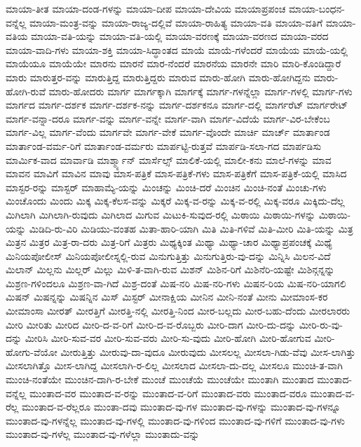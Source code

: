 {ಮಾಯಾ-ತೀತ
ಮಾಯಾ-ದಂಡ-ಗಳನ್ನು
ಮಾಯಾ-ದೀಪ
ಮಾಯಾ-ದೇವಿಯ
ಮಾಯಾಪ್ರಪಂಚ
ಮಾಯಾ-ಬಂಧನ-ವನ್ನೆಲ್ಲ
ಮಾಯಾ-ಮಂತ್ರ-ವನ್ನು
ಮಾಯಾ-ರಾಜ್ಯ-ದಲ್ಲಿವೆ
ಮಾಯಾ-ರಾಹಿತ್ಯ
ಮಾಯಾ-ವತಿ
ಮಾಯಾ-ವತಿಗೆ
ಮಾಯಾ-ವತಿಯ
ಮಾಯಾ-ವತಿ-ಯನ್ನು
ಮಾಯಾ-ವತಿ-ಯಲ್ಲಿ
ಮಾಯಾ-ವರಣಕ್ಕೆ
ಮಾಯಾ-ವರಣದ
ಮಾಯಾ-ವರದ
ಮಾಯಾ-ವಾದಿ-ಗಳು
ಮಾಯಾ-ಶಕ್ತಿ
ಮಾಯಾ-ಸಿದ್ಧಾಂತದ
ಮಾಯೆ
ಮಾಯೆ-ಗಳೆಂದರೆ
ಮಾಯೆಯ
ಮಾಯೆ-ಯಲ್ಲಿ
ಮಾಯೆಯೂ
ಮಾಯೆಯೇ
ಮಾರನು
ಮಾರನೆ
ಮಾರ-ನೆಂದರೆ
ಮಾರನೆಯ
ಮಾರನೇ
ಮಾರಿ
ಮಾರಿ-ಕೊಂಡಿದ್ದಾರೆ
ಮಾರು
ಮಾರುತ್ತರ-ವನ್ನು
ಮಾರುತ್ತಿದ್ದ
ಮಾರುತ್ತಿದ್ದರು
ಮಾರುವ
ಮಾರು-ಹೋಗಿ
ಮಾರು-ಹೋಗಿದ್ದನು
ಮಾರು-ಹೋಗಿ-ರುವೆ
ಮಾರು-ಹೋದರು
ಮಾರ್ಗ
ಮಾರ್ಗಕ್ಕಾಗಿ
ಮಾರ್ಗಕ್ಕೆ
ಮಾರ್ಗ-ಗಳನ್ನೆಲ್ಲಾ
ಮಾರ್ಗ-ಗಳಲ್ಲಿ
ಮಾರ್ಗ-ಗಳು
ಮಾರ್ಗದ
ಮಾರ್ಗ-ದರ್ಶಕ
ಮಾರ್ಗ-ದರ್ಶಕ-ನನ್ನು
ಮಾರ್ಗ-ದರ್ಶಕನೂ
ಮಾರ್ಗ-ದಲ್ಲಿ
ಮಾರ್ಗರೆಟ್
ಮಾರ್ಗರೇಟ್
ಮಾರ್ಗ-ವನ್ನಾ-ದರೂ
ಮಾರ್ಗ-ವನ್ನು
ಮಾರ್ಗ-ವನ್ನೇ
ಮಾರ್ಗ-ವಾಗಿ
ಮಾರ್ಗ-ವಿದೆಯೆ
ಮಾರ್ಗ-ವಿರ-ಬೇಕೆಂಬ
ಮಾರ್ಗ-ವಿಲ್ಲ
ಮಾರ್ಗ-ವೆಂದು
ಮಾರ್ಗವೇ
ಮಾರ್ಗ-ವೇಕೆ
ಮಾರ್ಗ-ವೊಂದೇ
ಮಾರ್ಚಿ
ಮಾರ್ಚ್
ಮಾರ್ತಾಂಡ
ಮಾರ್ತಾಂಡ-ವರ್ಮ-ರಿಗೆ
ಮಾರ್ತಾಂಡ-ವರ್ಮರು
ಮಾರ್ಪಟ್ಟಿ-ರುತ್ತವೆ
ಮಾರ್ಪಡಿ-ಸಲಾ-ಗದ
ಮಾರ್ಪಡಿಸು
ಮಾರ್ಮಿಕ-ವಾದ
ಮಾರ್ವಾಡಿ
ಮಾರ್ಶ್ಮ್ಯಾನ್
ಮಾರ್ಸೆಲ್ಸ್
ಮಾಲಿಕೆ-ಯಲ್ಲಿ
ಮಾಲೀ-ಕನು
ಮಾಲೆ-ಗಳನ್ನು
ಮಾವ
ಮಾವನ
ಮಾವಿಗೆ
ಮಾವಿನ
ಮಾವು
ಮಾಸ-ಪತ್ರಿಕೆ
ಮಾಸ-ಪತ್ರಿಕೆ-ಗಳು
ಮಾಸ-ಪತ್ರಿಕೆಗೆ
ಮಾಸ-ಪತ್ರಿಕೆ-ಯಲ್ಲಿ
ಮಾಸಿದ
ಮಾಸ್ಟರ-ರನ್ನು
ಮಾಸ್ಟರ್
ಮಾಹಾಮ್ಯೆ-ಯನ್ನು
ಮಿಂಚನ್ನು
ಮಿಂಚಿ-ದರೆ
ಮಿಂಚಿನ
ಮಿಂಚಿ-ನಂತೆ
ಮಿಂಚು-ಗಳು
ಮಿಂಚೊಂದು
ಮಿಂದು
ಮಿಕ್ಕ
ಮಿಕ್ಕ-ಕೆಲಸ-ವನ್ನು
ಮಿಕ್ಕರೆ
ಮಿಕ್ಕ-ವ-ರನ್ನು
ಮಿಕ್ಕ-ವ-ರಲ್ಲಿ
ಮಿಕ್ಕ-ವರೂ
ಮಿಕ್ಕಿದು-ದೆಲ್ಲ
ಮಿಗಿಲಾಗಿ
ಮಿಗಿಲಾಗಿ-ರುವುದು
ಮಿಗಿಲಾದ
ಮಿಗುವ
ಮಿಟುಕಿ-ಸುವುದ-ರಲ್ಲಿ
ಮಿಠಾಯಿ
ಮಿಠಾಯಿ-ಗಳನ್ನು
ಮಿಠಾಯಿ-ಯನ್ನು
ಮಿಡಿದಿ-ರು-ವಿರಿ
ಮಿಡಿಯು-ವಂತಹ
ಮಿತಾ-ಹಾರಿ-ಯಾಗಿ
ಮಿತಿ
ಮಿತಿ-ಗಳಿವೆ
ಮಿತಿ-ಮೀರಿ
ಮಿತಿ-ಯನ್ನು
ಮಿತ್ರ
ಮಿತ್ರನ
ಮಿತ್ರರ
ಮಿತ್ರ-ರಾ-ದರು
ಮಿತ್ರ-ರಿಗೆ
ಮಿತ್ರರು
ಮಿಥ್ಯಕ್ಕಿಂತ
ಮಿಥ್ಯಾ
ಮಿಥ್ಯಾ-ಚಾರ
ಮಿಥ್ಯಾಪ್ರಪಂಚಕ್ಕೆ
ಮಿಥ್ಯೆ
ಮಿನಿಯಪೋಲೀಸ್
ಮಿನಿಯಪೋಲೀಸ್ನಲ್ಲಿ-ರುವ
ಮಿನುಗುತ್ತಿತ್ತು
ಮಿನುಗುತ್ತಿರು-ವು-ದನ್ನು
ಮಿನ್ನಿಸಿ
ಮಿಲನ-ವಿದೆ
ಮಿಲಾನ್
ಮಿಲ್ಲನು
ಮಿಲ್ಲರ್
ಮಿಲ್ಲು
ಮಿಳಿ-ತ-ವಾಗಿ-ರುವ
ಮಿಶನ್
ಮಿಶಿನ-ರಿಗೆ
ಮಿಶಿನೆರಿ-ಯಷ್ಟೇ
ಮಿಶಿನ್ಗನ್ನನ್ನು
ಮಿಶ್ರಣ-ಗಳಿಂದಲೂ
ಮಿಶ್ರಣ-ವಾ-ಗಿದೆ
ಮಿಶ್ರ-ದಂತೆ
ಮಿಷ-ನರಿ
ಮಿಷ-ನರಿ-ಗಳು
ಮಿಷನ-ರಿಯ
ಮಿಷ-ನರಿ-ಯಾಗಲಿ
ಮಿಷನ್
ಮಿಷನ್ನನ್ನು
ಮಿಷನ್ನಿನ
ಮಿಸ್
ಮಿಸ್ಟರ್
ಮೀನಾಕ್ಷಿಯ
ಮೀನಿನ
ಮೀನಿ-ನಂತೆ
ಮೀನು
ಮೀಮಾಂಸ-ಕರ
ಮೀಮಾಂಸಾ
ಮೀರತ್
ಮೀರತ್ತಿಗೆ
ಮೀರತ್ತಿ-ನಲ್ಲಿ
ಮೀರತ್ತಿ-ನಿಂದ
ಮೀರ-ಬಲ್ಲದು
ಮೀರ-ಬಹು-ದೆಂದು
ಮೀರಲಾರರು
ಮೀರಿ
ಮೀರಿತು
ಮೀರಿದ
ಮೀರಿ-ದ-ವ-ರಿಗೆ
ಮೀರಿ-ದ-ವ-ರೊಬ್ಬರು
ಮೀರಿ-ದಾಗ
ಮೀರಿ-ದು-ದನ್ನು
ಮೀರಿ-ರು-ವು-ದನ್ನು
ಮೀರಿಸಿ
ಮೀರಿ-ಸುವ-ವರ
ಮೀರಿ-ಸುವ-ವರು
ಮೀರಿ-ಸು-ವುದು
ಮೀರಿ-ಹೋಗಿ
ಮೀರಿ-ಹೋಗುವ
ಮೀರಿ-ಹೋಗು-ವೆಯೋ
ಮೀರುತ್ತಿತ್ತು
ಮೀರುವು-ದಾ-ವುದೂ
ಮೀರುವುದು
ಮೀಸಲಲ್ಲ
ಮೀಸಲಾ-ಗಿಡು-ವೆವು
ಮೀಸ-ಲಾಗಿತ್ತು
ಮೀಸಲಾಗಿತ್ತೊ
ಮೀಸ-ಲಾಗಿದ್ದ
ಮೀಸಲಾಗಿ-ರ-ಲಿಲ್ಲ
ಮೀಸಲಾದ
ಮೀಸಲಾ-ದು-ದಲ್ಲ
ಮೀಸಲೂ
ಮುಂಚಿ-ತ-ವಾಗಿ
ಮುಂಚಿ-ನಂತೆಯೇ
ಮುಂಚಿನ-ದಾಗಿ-ರ-ಬೇಕೆ
ಮುಂಚೆ
ಮುಂಚೆಯೆ
ಮುಂಚೆಯೇ
ಮುಂತಾಗಿ
ಮುಂತಾದ
ಮುಂತಾದ-ವನ್ನೆಲ್ಲ
ಮುಂತಾದ-ವರ
ಮುಂತಾದ-ವ-ರನ್ನು
ಮುಂತಾದ-ವ-ರಿಗೆ
ಮುಂತಾದ-ವರು
ಮುಂತಾದ-ವರೂ
ಮುಂತಾದ-ವ-ರೆಲ್ಲ
ಮುಂತಾದ-ವ-ರೆಲ್ಲರೂ
ಮುಂತಾ-ದವು
ಮುಂತಾದ-ವು-ಗಳ
ಮುಂತಾದ-ವು-ಗಳನ್ನು
ಮುಂತಾದ-ವು-ಗಳನ್ನೂ
ಮುಂತಾದ-ವು-ಗಳನ್ನೆಲ್ಲ
ಮುಂತಾದ-ವು-ಗಳಲ್ಲಿ
ಮುಂತಾದ-ವು-ಗಳಿಂದ
ಮುಂತಾದ-ವು-ಗಳಿಗೆ
ಮುಂತಾದ-ವು-ಗಳು
ಮುಂತಾದ-ವು-ಗಳೆಲ್ಲ
ಮುಂತಾದ-ವು-ಗಳೆಲ್ಲಾ
ಮುಂತಾದು-ವನ್ನು
}
